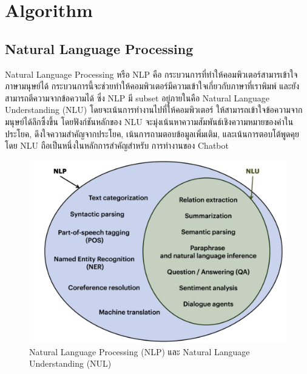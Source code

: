 \section {Algorithm}
\subsection{Natural Language Processing}
Natural Language Processing หรือ NLP คือ กระบวนการที่ทำให้คอมพิวเตอร์สามารเข้าใจภาษามนุษย์ได้
กระบวนการนี้จะช่วยทำให้คอมพิวเตอร์มีความเข้าใจเกี่ยวกับภาษาที่เราพิมพ์ และยังสามารถตีความจากข้อความได้
ซึ่ง NLP มี subset อยู่ภายในคือ Natural Language Understanding (NLU) โดยจะเน้นการทำงานไปที่ให้คอมพิวเตอร์
ให้สามารถเข้าใจข้อความจากมนุษย์ได้ลึกซึ้งขึ้น โดยฟังก์ชันหลักของ NLU จะมุ่งเน้นหาความสัมพันธ์เชิงความหมายของคำในประโยค,
ดึงใจความสำคัญจากประโยค, เน้นการถามตอบข้อมูลเพิ่มเติม, และเน้นการตอบโต้พูดคุย โดย NLU ถือเป็นหนึ่งในหลักการสำคัญสำหรับ
การทำงานของ Chatbot

\begin{figure}[hbt!]
  \begin{center}
    \includegraphics[width=\textwidth,keepaspectratio]{pic/NLPandNUL.png}
  \end{center}
  \caption{Natural Language Processing (NLP) และ Natural Language Understanding (NUL)}
  \label{fig:NLPandNUL}
\end{figure}

